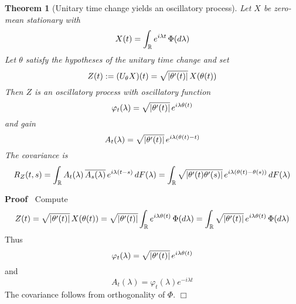 \documentclass{article}
\newcommand{\assign}{:=}
\newenvironment{proof}{\noindent\textbf{Proof\ }}{\hspace*{\fill}$\Box$\medskip}
\newtheorem{theorem}{Theorem}
\begin{document}
\begin{theorem}
  [Unitary time change yields an oscillatory process] Let $X$ be zero-mean
  stationary with
  \begin{equation}
    X (t) = \int_{\mathbb{R}} e^{i \lambda t}  \hspace{0.17em} \Phi (d
    \lambda)
  \end{equation}
  Let $\theta$ satisfy the hypotheses of the unitary time change and set
  \begin{equation}
    Z (t) \assign (U_{\theta} X) (t) = \sqrt{| \theta' (t) |}  \hspace{0.17em}
    X (\theta (t))
  \end{equation}
  Then $Z$ is an oscillatory process with oscillatory function
  \begin{equation}
    \varphi_t (\lambda) = \sqrt{| \theta' (t) |}  \hspace{0.17em} e^{i \lambda
    \theta (t)}
  \end{equation}
  and gain
  \begin{equation}
    A_t (\lambda) = \sqrt{| \theta' (t) |}  \hspace{0.17em} e^{i \lambda
    (\theta (t) - t)}
  \end{equation}
  The covariance is
  \begin{equation}
    R_Z (t, s) = \int_{\mathbb{R}} A_t (\lambda) \hspace{0.17em} \overline{A_s
    (\lambda)} \hspace{0.17em} e^{i \lambda (t - s)}  \hspace{0.17em} dF
    (\lambda) = \int_{\mathbb{R}} \sqrt{| \theta' (t) \theta' (s) |} 
    \hspace{0.17em} e^{i \lambda (\theta (t) - \theta (s))}  \hspace{0.17em}
    dF (\lambda)
  \end{equation}
\end{theorem}

\begin{proof}
  Compute
  \begin{equation}
    Z (t) = \sqrt{| \theta' (t) |}  \hspace{0.17em} X (\theta (t)) = \sqrt{|
    \theta' (t) |}  \int_{\mathbb{R}} e^{i \lambda \theta (t)} 
    \hspace{0.17em} \Phi (d \lambda) = \int_{\mathbb{R}} \sqrt{| \theta' (t)
    |}  \hspace{0.17em} e^{i \lambda \theta (t)}  \hspace{0.17em} \Phi (d
    \lambda)
  \end{equation}
  Thus
  \begin{equation}
    \varphi_t (\lambda) = \sqrt{| \theta' (t) |}  \hspace{0.17em} e^{i \lambda
    \theta (t)}
  \end{equation}
  and
  \begin{equation}
    A_t (\lambda) = \varphi_t (\lambda) e^{- i \lambda t}
  \end{equation}
  The covariance follows from orthogonality of $\Phi$.
\end{proof}
\end{document}
